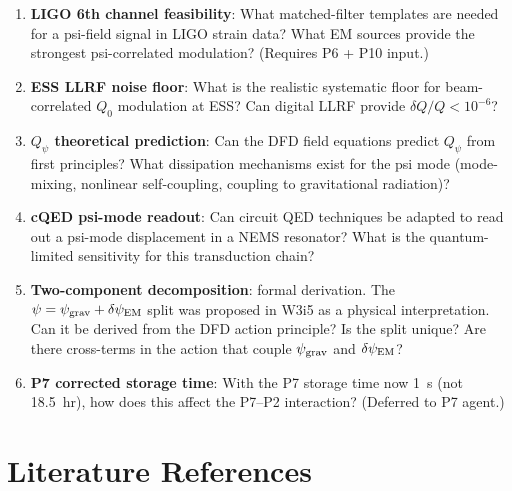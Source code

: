 \documentclass[11pt]{article}
\newcommand{\Qpsi}{Q_\psi}
\newcommand{\psigrav}{\psi_{\rm grav}}
\newcommand{\dpsiEM}{\delta\psi_{\rm EM}}
\theoremstyle{definition}
\theoremstyle{remark}
\begin{document}
\begin{enumerate}[label=\textbf{OQ-\arabic*.}, itemsep=4pt]

\item \textbf{LIGO 6th channel feasibility}: What matched-filter templates
  are needed for a psi-field signal in LIGO strain data? What EM sources
  provide the strongest psi-correlated modulation? (Requires P6 + P10 input.)

\item \textbf{ESS LLRF noise floor}: What is the realistic systematic
  floor for beam-correlated $Q_0$ modulation at ESS? Can digital LLRF
  provide $\delta Q/Q < 10^{-6}$?

\item \textbf{$\Qpsi$ theoretical prediction}: Can the DFD field equations
  predict $\Qpsi$ from first principles? What dissipation mechanisms
  exist for the psi mode (mode-mixing, nonlinear self-coupling, coupling
  to gravitational radiation)?

\item \textbf{cQED psi-mode readout}: Can circuit QED techniques be
  adapted to read out a psi-mode displacement in a NEMS resonator?
  What is the quantum-limited sensitivity for this transduction chain?

\item \textbf{Two-component decomposition}: formal derivation.
  The $\psi = \psigrav + \dpsiEM$ split was proposed in W3i5 as a
  physical interpretation. Can it be derived from the DFD action
  principle? Is the split unique? Are there cross-terms in the
  action that couple $\psigrav$ and $\dpsiEM$?

\item \textbf{P7 corrected storage time}: With the P7 storage time
  now 1~s (not 18.5~hr), how does this affect the P7--P2 interaction?
  (Deferred to P7 agent.)

\end{enumerate}

\section*{Literature References}
\end{document}
